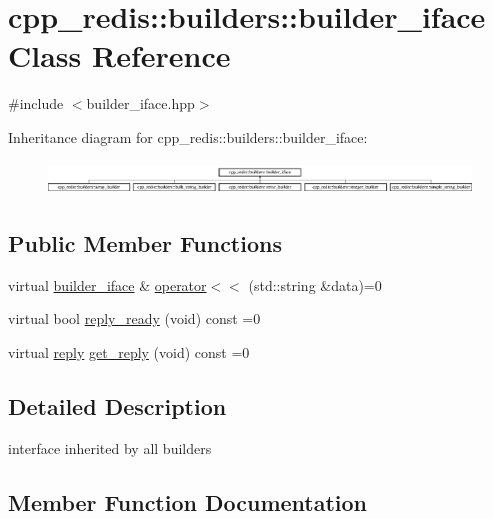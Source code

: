 \hypertarget{classcpp__redis_1_1builders_1_1builder__iface}{}\section{cpp\+\_\+redis\+:\+:builders\+:\+:builder\+\_\+iface Class Reference}
\label{classcpp__redis_1_1builders_1_1builder__iface}


{\ttfamily \#include $<$builder\+\_\+iface.\+hpp$>$}

Inheritance diagram for cpp\+\_\+redis\+:\+:builders\+:\+:builder\+\_\+iface\+:\begin{figure}[H]
\begin{center}
\leavevmode
\includegraphics[height=0.888889cm]{classcpp__redis_1_1builders_1_1builder__iface}
\end{center}
\end{figure}
\subsection*{Public Member Functions}
\begin{DoxyCompactItemize}
\item 
virtual \mbox{\hyperlink{classcpp__redis_1_1builders_1_1builder__iface}{builder\+\_\+iface}} \& \mbox{\hyperlink{classcpp__redis_1_1builders_1_1builder__iface_a9892bbc9c887c31c2742dad4476e2fa6}{operator$<$$<$}} (std\+::string \&data)=0
\item 
virtual bool \mbox{\hyperlink{classcpp__redis_1_1builders_1_1builder__iface_a40db9a31d4ea1771777e74146d31e12d}{reply\+\_\+ready}} (void) const =0
\item 
virtual \mbox{\hyperlink{classcpp__redis_1_1reply}{reply}} \mbox{\hyperlink{classcpp__redis_1_1builders_1_1builder__iface_afd2ff2c2371c2a486116543b638b9413}{get\+\_\+reply}} (void) const =0
\end{DoxyCompactItemize}


\subsection{Detailed Description}
interface inherited by all builders 

\subsection{Member Function Documentation}
\mbox{\label{classcpp__redis_1_1builders_1_1builder__iface_afd2ff2c2371c2a486116543b638b9413}} 

